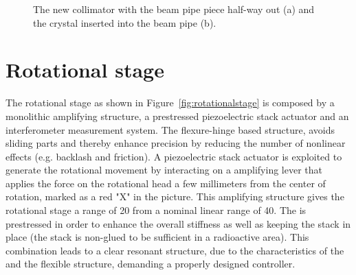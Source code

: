 \begin{figure}[tpb]
  \centering %
  \qquad
  \caption{\label{fig:collimator-t} The new collimator with the beam pipe piece half-way out (a) and the crystal inserted into the beam pipe (b).}
\end{figure}

\FloatBarrier
\section{Rotational stage}
\label{sec:rotational_stage}
The rotational stage as shown in Figure~\ref{fig:rotationalstage} is composed by a monolithic amplifying structure, a prestressed piezoelectric stack actuator and an interferometer measurement system. The flexure-hinge based structure, avoids sliding parts and thereby enhance precision by reducing the number of nonlinear effects (e.g. backlash and friction). A piezoelectric stack actuator is exploited to generate the rotational movement by interacting on a amplifying lever that applies the force on the rotational head a few millimeters from the center of rotation, marked as a red "X" in the picture. This amplifying structure gives the rotational stage a range of \unit{20}{\milli\rad} from a nominal linear range of \unit{40}{\micro\meter}.  The \abbrPEA is prestressed in order to enhance the overall stiffness as well as keeping the stack in place (the stack is non-glued to be sufficient in a radioactive area). This combination leads to a clear resonant structure, due to the characteristics of the \abbrPEA and the flexible structure, demanding a properly designed controller.

